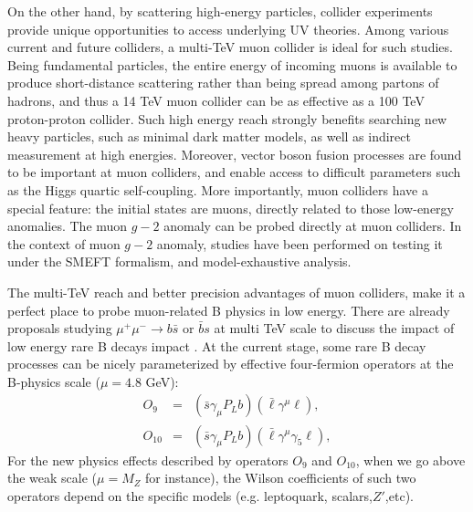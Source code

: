 \documentclass[a4paper,11pt]{article}
\begin{document}
On the other hand, by scattering high-energy particles,
collider experiments provide unique opportunities to access underlying UV theories.
Among various current and future colliders\cite{Shiltsev:2019rfl},
a multi-TeV muon collider\cite{Aime:2022flm,MuonCollider:2022xlm} is ideal for such studies.
Being fundamental particles, the entire energy of incoming muons is available to produce short-distance scattering rather than being spread among partons of hadrons,
and thus a 14 TeV muon collider can be as effective as a 100 TeV proton-proton collider\cite{Delahaye:2019omf}.
Such high energy reach strongly benefits searching new heavy particles, such as minimal dark matter models\cite{Han:2020uak,Bottaro:2021snn},
as well as indirect measurement at high energies\cite{Buttazzo:2020uzc}.
Moreover, vector boson fusion processes are found to be important at muon colliders\cite{Costantini:2020stv},
and enable access to difficult parameters such as the Higgs quartic self-coupling\cite{Chiesa:2020awd}.
More importantly, muon colliders have a special feature: the initial states are muons, directly related to those low-energy anomalies. 
The muon $g-2$ anomaly can be probed directly at muon colliders\cite{Buttazzo:2020ibd}.
In the context of muon $g-2$ anomaly, studies have been performed on testing it under the SMEFT formalism\cite{Buttazzo:2020ibd}, and model-exhaustive analysis\cite{Buttazzo:2020ibd,Capdevilla:2020qel,Capdevilla:2021rwo,Capdevilla:2021kcf}.

The multi-TeV reach and better precision advantages of muon colliders, make it a perfect place to probe muon-related B physics in low energy. 
There are already proposals studying $\mu^+\mu^-\to b\bar{s}$ or $\bar{b}s$ at multi TeV scale to discuss the impact of low energy rare B decays impact \cite{Altmannshofer:2022xri,Huang:2021nkl}. 
At the current stage, some rare B decay processes can be nicely parameterized by effective four-fermion operators at the B-physics scale ($\mu= 4.8$ GeV):
 \begin{eqnarray}
   O_9 &=& (\bar{s}\gamma_\mu P_L b)(\bar{\ell}\gamma^{\mu}\ell),  \\
   O_{10} &=& (\bar{s}\gamma_\mu P_L b)(\bar{\ell}\gamma^{\mu}\gamma_5\ell),
\end{eqnarray}
For the new physics effects described by operators $O_9$ and $O_{10}$, when we go above the weak scale ($\mu=M_Z$ for instance), 
the Wilson coefficients of such two operators depend on the specific models (e.g. leptoquark, scalars,$Z'$,etc). 
\end{document}
